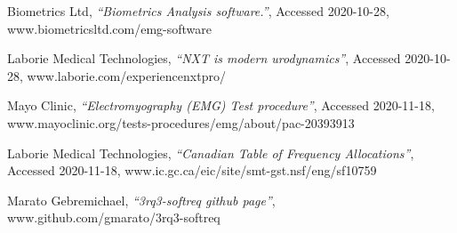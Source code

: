 \documentclass[12pt,a4paper]{article}
\begin{document}
\newpage
\begin{thebibliography}{9}

  Biometrics Ltd,
  \textit{“Biometrics Analysis software.”},
  Accessed 2020-10-28,
  www.biometricsltd.com/emg-software
  
  Laborie Medical Technologies,
  \textit{“NXT is modern urodynamics”},
  Accessed 2020-10-28,
  www.laborie.com/experiencenxtpro/

  Mayo Clinic,
  \textit{“Electromyography (EMG) Test procedure”},
  Accessed 2020-11-18,
  www.mayoclinic.org/tests-procedures/emg/about/pac-20393913

  Laborie Medical Technologies,
  \textit{“Canadian Table of Frequency Allocations”},
  Accessed 2020-11-18,
  www.ic.gc.ca/eic/site/smt-gst.nsf/eng/sf10759

  Marato Gebremichael,
  \textit{“3rq3-softreq github page”},
  www.github.com/gmarato/3rq3-softreq
 
\end{thebibliography}
\end{document}
